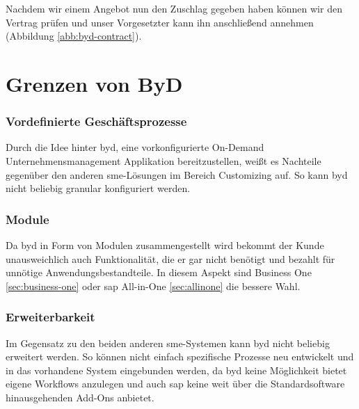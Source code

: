 Nachdem wir einem Angebot nun den Zuschlag gegeben haben können wir den Vertrag prüfen und unser Vorgesetzter kann ihn anschließend annehmen (Abbildung \ref{abb:byd-contract}).

\section{Grenzen von ByD}

\subsubsection{Vordefinierte Geschäftsprozesse}

Durch die Idee hinter \gls{byd}, eine vorkonfigurierte On-Demand Unternehmensmanagement Applikation bereitzustellen, weißt es Nachteile gegenüber den anderen \gls{sme}-Lösungen im Bereich Customizing auf. So kann \gls{byd} nicht beliebig granular konfiguriert werden.

\subsubsection{Module}

Da \gls{byd} in Form von Modulen zusammengestellt wird bekommt der Kunde unausweichlich auch Funktionalität, die er gar nicht benötigt und bezahlt für unnötige Anwendungsbestandteile. In diesem Aspekt sind Business One \ref{sec:business-one} oder \gls{sap} All-in-One \ref{sec:allinone} die bessere Wahl.

\subsubsection{Erweiterbarkeit}

Im Gegensatz zu den beiden anderen \gls{sme}-Systemen kann \gls{byd} nicht beliebig erweitert werden. So können nicht einfach spezifische Prozesse neu entwickelt und in das vorhandene System eingebunden werden, da \gls{byd} keine Möglichkeit bietet eigene Workflows anzulegen und auch \gls{sap} keine weit über die Standardsoftware hinausgehenden Add-Ons anbietet.

